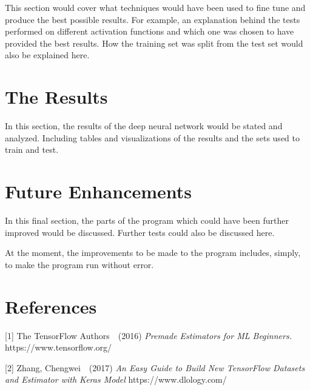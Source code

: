 \documentclass{article}
\begin{document}
This section would cover what techniques would have been used
to fine tune and produce the best possible results. For example, an explanation
behind the tests performed on different activation functions and
which one was chosen to have provided the best results. How the
training set was split from the test set would also be explained here.

\section{The Results}

In this section, the results of the deep neural network would
be stated and analyzed. Including tables and visualizations of
the results and the sets used to train and test.

\section{Future Enhancements}

In this final section, the parts of the program which could have
been further improved would be discussed. Further tests could also
be discussed here.

At the moment, the improvements to be made to the program includes,
simply, to make the program run without error.

\section*{References}

\small

[1] The TensorFlow Authors\ \ (2016) {\it Premade Estimators for ML
Beginners.} https://www.tensorflow.org/

[2] Zhang, Chengwei\ \ (2017) {\it An Easy Guide to Build New TensorFlow Datasets and Estimator with Keras Model} https://www.dlology.com/
\end{document}
